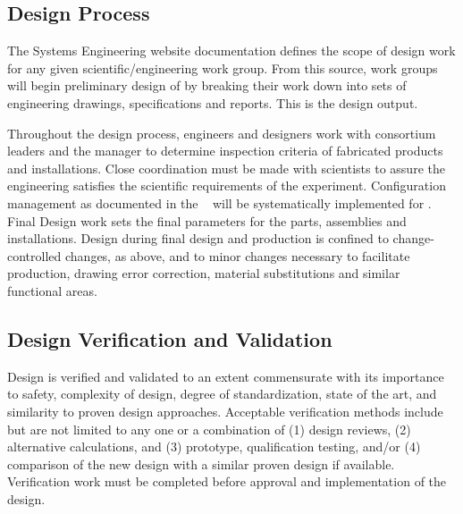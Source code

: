 \subsection{Design Process}

The  Systems Engineering website
documentation defines the scope of design work for any given
scientific/engineering work group. From this source, work groups
will begin preliminary design of  by breaking their work
down into sets of engineering drawings, specifications and
reports. This is the design output.

Throughout the design process, engineers and designers work with
consortium leaders and the   manager to
determine  inspection criteria of fabricated products and
installations. Close coordination must be made with 
scientists to assure the engineering satisfies the scientific
requirements of the experiment. Configuration management as documented
in the  ~\cite{bib:docdb82} will be
systematically implemented for . Final Design work sets
the final  parameters for the parts, assemblies and
installations. Design during final design and production is confined
to change-controlled changes, as above, and to minor changes necessary
to facilitate production, drawing error correction, material
substitutions and similar functional areas.

\subsection{Design Verification and Validation}
\label{sec:verification}

Design is verified and validated to an extent commensurate with its
importance to safety, complexity of design, degree of standardization,
state of the art, and similarity to proven design
approaches. Acceptable verification methods include but are not
limited to any one or a combination of (1) design reviews, (2)
alternative calculations, and (3) prototype, qualification testing,
and/or (4) comparison of the new design with a similar proven design
if available. Verification work must be completed before approval and
implementation of the design.

